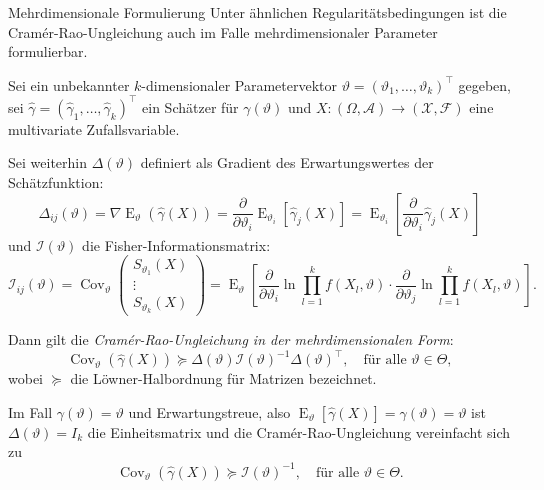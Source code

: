 \begin{defi}{Mehrdimensionale Formulierung}
    Unter ähnlichen Regularitätsbedingungen ist die Cramér-Rao-Ungleichung auch im Falle mehrdimensionaler Parameter formulierbar.

    Sei ein unbekannter $k$-dimensionaler Parametervektor $\vartheta = (\vartheta_1, \dotsc, \vartheta_k)^\top$ gegeben, sei $\hat{\gamma} = (\hat{\gamma}_1, \dotsc, \hat{\gamma}_k)^\top$ ein Schätzer für $\gamma(\vartheta)$ und $X: (\Omega, \mathcal{A}) \to (\mathcal{X}, \mathcal{F})$ eine multivariate Zufallsvariable.

    Sei weiterhin $\Delta(\vartheta)$ definiert als Gradient des Erwartungswertes der Schätzfunktion:
    \[
        \Delta_{ij}(\vartheta) = \nabla \operatorname{E}_{\vartheta}(\hat{\gamma}(X)) = \frac{\partial}{\partial \vartheta_i} \operatorname{E}_{\vartheta_i}[\hat{\gamma}_j(X)] = \operatorname{E}_{\vartheta_i} \left[ \frac{\partial}{\partial \vartheta_i} \hat{\gamma}_j(X) \right]
    \]
    und $\mathcal{I}(\vartheta)$ die Fisher-Informationsmatrix:
    \[
        \mathcal{I}_{ij}(\vartheta) = \operatorname{Cov}_{\vartheta} \begin{pmatrix} S_{\vartheta_1}(X) \\ \vdots \\ S_{\vartheta_k}(X) \end{pmatrix} = \operatorname{E}_{\vartheta} \left[ \frac{\partial}{\partial \vartheta_i} \ln \prod_{l=1}^k f(X_l, \vartheta) \cdot \frac{\partial}{\partial \vartheta_j} \ln \prod_{l=1}^k f(X_l, \vartheta) \right].
    \]

    Dann gilt die \emph{Cramér-Rao-Ungleichung in der mehrdimensionalen Form}:
    \[
        \operatorname{Cov}_{\vartheta}(\hat{\gamma}(X)) \succeq \Delta(\vartheta) \mathcal{I}(\vartheta)^{-1} \Delta(\vartheta)^\top, \quad \text{für alle } \vartheta \in \Theta,
    \]
    wobei $\succeq$ die Löwner-Halbordnung für Matrizen bezeichnet.

    Im Fall $\gamma(\vartheta) = \vartheta$ und Erwartungstreue, also $\operatorname{E}_{\vartheta}[\hat{\gamma}(X)] = \gamma(\vartheta) = \vartheta$ ist $\Delta(\vartheta) = I_k$ die Einheitsmatrix und die Cramér-Rao-Ungleichung vereinfacht sich zu
    \[
        \operatorname{Cov}_{\vartheta}(\hat{\gamma}(X)) \succeq \mathcal{I}(\vartheta)^{-1}, \quad \text{für alle } \vartheta \in \Theta.
    \]
\end{defi}

